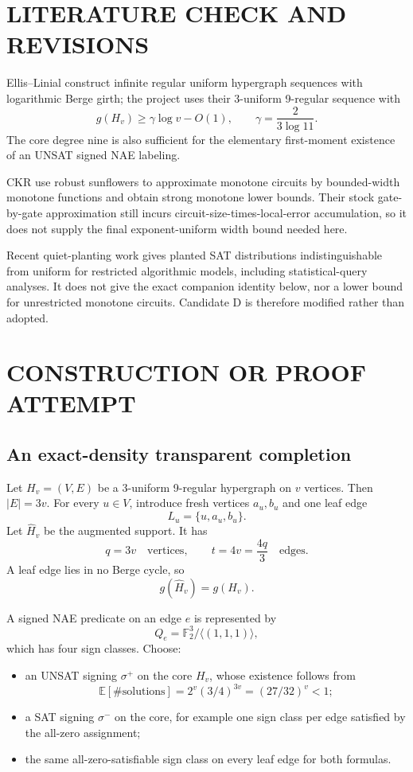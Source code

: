 \documentclass[11pt]{article}
\begin{document}
\section{LITERATURE CHECK AND REVISIONS}
Ellis--Linial construct infinite regular uniform hypergraph sequences with logarithmic Berge girth; the project uses their 3-uniform 9-regular sequence with
\[
g(H_v)\ge \gamma\log v-O(1),\qquad \gamma=\frac{2}{3\log 11}.
\]
The core degree nine is also sufficient for the elementary first-moment existence of an UNSAT signed NAE labeling.

CKR use robust sunflowers to approximate monotone circuits by bounded-width monotone functions and obtain strong monotone lower bounds. Their stock gate-by-gate approximation still incurs circuit-size-times-local-error accumulation, so it does not supply the final exponent-uniform width bound needed here.

Recent quiet-planting work gives planted SAT distributions indistinguishable from uniform for restricted algorithmic models, including statistical-query analyses. It does not give the exact companion identity below, nor a lower bound for unrestricted monotone circuits. Candidate D is therefore modified rather than adopted.

\section{CONSTRUCTION OR PROOF ATTEMPT}
\subsection{An exact-density transparent completion}
Let $H_v=(V,E)$ be a 3-uniform 9-regular hypergraph on $v$ vertices. Then $|E|=3v$. For every $u\in V$, introduce fresh vertices $a_u,b_u$ and one leaf edge
\[
L_u=\{u,a_u,b_u\}.
\]
Let $\widehat H_v$ be the augmented support. It has
\[
q=3v\quad\text{vertices},\qquad t=4v=\frac{4q}{3}\quad\text{edges}.
\]
A leaf edge lies in no Berge cycle, so
\[
g(\widehat H_v)=g(H_v).
\]

A signed NAE predicate on an edge $e$ is represented by
\[
Q_e=\mathbb F_2^3/\langle(1,1,1)\rangle,
\]
which has four sign classes. Choose:
\begin{itemize}
\item an UNSAT signing $\sigma^+$ on the core $H_v$, whose existence follows from
\[
\mathbb E[\#\mathrm{solutions}]
=2^v(3/4)^{3v}=(27/32)^v<1;
\]
\item a SAT signing $\sigma^-$ on the core, for example one sign class per edge satisfied by the all-zero assignment;
\item the same all-zero-satisfiable sign class on every leaf edge for both formulas.
\end{itemize}
\end{document}

